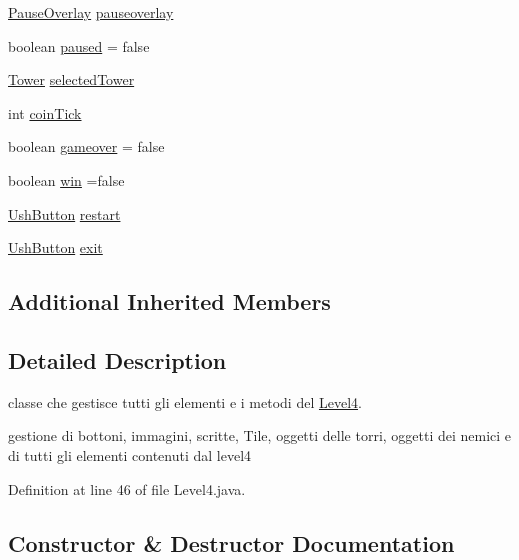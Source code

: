 \begin{DoxyCompactItemize}
\hyperlink{classui_1_1_pause_overlay}{Pause\+Overlay} \hyperlink{classscenes_1_1_level4_a544fb9294d892e35b4b0316e07997cd6}{pauseoverlay}
\item 
boolean \hyperlink{classscenes_1_1_level4_aa1e43f4bcbc826434b83c0f3ec507143}{paused} = false
\item 
\hyperlink{classtowers_1_1_tower}{Tower} \hyperlink{classscenes_1_1_level4_af6b1162bc2f00f8d549aae075ddd5a8b}{selected\+Tower}
\item 
int \hyperlink{classscenes_1_1_level4_aa48bc6c9a2648651d6484c9063ca1b8f}{coin\+Tick}
\item 
boolean \hyperlink{classscenes_1_1_level4_a962cec751fe966ea7bf381c68ab5c70f}{gameover} = false
\item 
boolean \hyperlink{classscenes_1_1_level4_a1cc7b399bb950a160021766cd9a126f8}{win} =false
\item 
\hyperlink{classui_1_1_ush_button}{Ush\+Button} \hyperlink{classscenes_1_1_level4_ac1d34384911014e49613ccfb1abddbcc}{restart}
\item 
\hyperlink{classui_1_1_ush_button}{Ush\+Button} \hyperlink{classscenes_1_1_level4_a08590df28bf721b1cf1670cf0f8f7341}{exit}
\end{DoxyCompactItemize}
\subsection*{Additional Inherited Members}


\subsection{Detailed Description}
classe che gestisce tutti gli elementi e i metodi del \hyperlink{classscenes_1_1_level4}{Level4}. 

gestione di bottoni, immagini, scritte, Tile, oggetti delle torri, oggetti dei nemici e di tutti gli elementi contenuti dal level4 

Definition at line 46 of file Level4.\+java.



\subsection{Constructor \& Destructor Documentation}
\mbox{\label{classscenes_1_1_level4_ace3453f4ef6ea220bef6de5f957e89d5}} 
